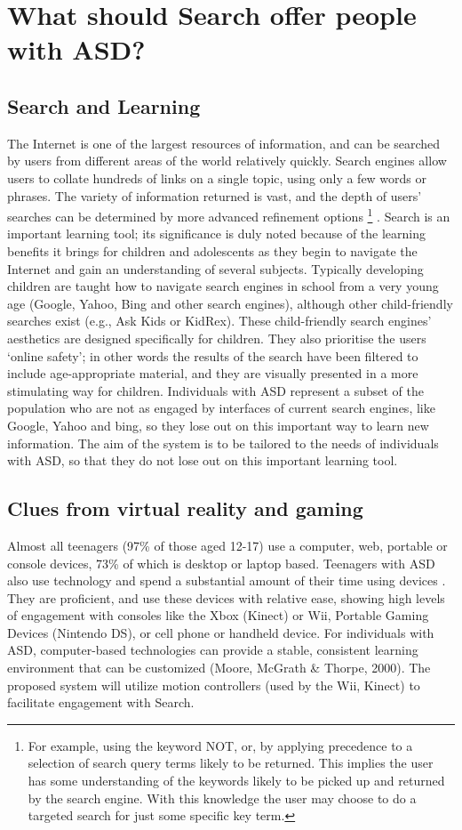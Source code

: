 \documentclass[11pt]{article}
\begin{document}
\section{What should Search offer people with ASD?}\label{What should Search offer people with ASD}
\subsection{Search and Learning}
The Internet is one of the largest resources of information, and can be searched by users from different areas of the world relatively quickly. Search engines allow users to collate hundreds of links on a single topic, using only a few words or phrases. The variety of information returned is vast, and the depth of users’ searches can be determined by more advanced refinement options \footnote{For example, using the keyword NOT, or, by applying precedence to a selection of search query terms likely to be returned. This implies the user has some understanding of the keywords likely to be picked up and returned by the search engine. With this knowledge the user may choose to do a targeted search for just some specific key term.} . Search is an important learning tool; its significance is duly noted because of the learning benefits it brings for children and adolescents as they begin to navigate the Internet and gain an understanding of several subjects. 
Typically developing children are taught how to navigate search engines in school from a very young age (Google, Yahoo, Bing and other search engines), although other child-friendly searches exist (e.g., Ask Kids or KidRex). These child-friendly search engines’ aesthetics are designed specifically for children. They also prioritise the users ‘online safety’; in other words the results of the search have been filtered to include age-appropriate material, and they are visually presented in a more stimulating way for children.  Individuals with ASD represent a subset of the population who are not as engaged by interfaces of current search engines, like Google, Yahoo and bing, so they lose out on this important way to learn new information. The aim of the system is to be tailored to the needs of individuals with ASD, so that they do not lose out on this important learning tool.

\subsection{Clues from virtual reality and gaming}
Almost all teenagers (97\% of those aged 12-17) use a computer, web, portable or console devices, 73\% of which is desktop or laptop based. Teenagers with ASD also use technology and spend a substantial amount of their time using devices \cite{Shane and Albert}. They are proficient, and use these devices with relative ease, showing high levels of engagement with consoles like the Xbox (Kinect) or Wii, Portable Gaming Devices (Nintendo DS), or cell phone or handheld device. For individuals with ASD, computer-based technologies can provide a stable, consistent learning environment that can be customized (Moore, McGrath \& Thorpe, 2000). The proposed system will utilize motion controllers (used by the Wii, Kinect) to facilitate engagement with Search. 
\end{document}
